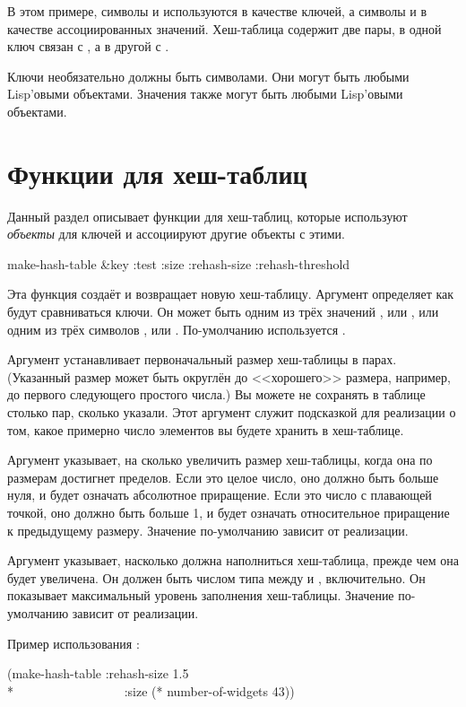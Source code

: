 В этом примере, символы  и  используются в качестве ключей, а
символы  и  в качестве ассоциированных значений. Хеш-таблица
содержит две пары, в одной ключ  связан с , а в другой
 с .

Ключи необязательно должны быть символами. Они могут быть любыми Lisp'овыми
объектами. Значения также могут быть любыми Lisp'овыми объектами.

\section{Функции для хеш-таблиц}

Данный раздел описывает функции для хеш-таблиц, которые используют
\emph{объекты} для ключей и ассоциируют другие объекты с этими.

\begin{defun}[Функция]
make-hash-table &key :test :size :rehash-size :rehash-threshold

Эта функция создаёт и возвращает новую хеш-таблицу.
Аргумент  определяет как будут сравниваться ключи.
Он может быть одним из трёх значений ,  или ,
или одним из трёх символов ,  или .
По-умолчанию используется .

Аргумент  устанавливает первоначальный размер хеш-таблицы в парах.
(Указанный размер может быть округлён до <<хорошего>> размера, например, до
первого следующего простого числа.)
Вы можете не сохранять в таблице столько пар, сколько указали. Этот аргумент
служит подсказкой для реализации о том, какое примерно число элементов вы будете
хранить в хеш-таблице.

Аргумент  указывает, на сколько увеличить размер хеш-таблицы,
когда она по размерам достигнет пределов.
Если это целое число, оно должно быть больше нуля, и будет означать абсолютное
приращение. Если это число с плавающей точкой, оно должно быть больше 1, и будет
означать относительное приращение к предыдущему размеру.
Значение по-умолчанию зависит от реализации.

\begin{newer}
Аргумент  указывает, насколько должна наполниться
хеш-таблица, прежде чем она будет увеличена. Он должен быть числом типа
 между  и , включительно.
Он показывает максимальный уровень заполнения хеш-таблицы.
Значение по-умолчанию зависит от реализации.
\end{newer}

Пример использования :
\begin{lisp}
(make-hash-table :rehash-size 1.5 \\*
~~~~~~~~~~~~~~~~~:size (* number-of-widgets 43))
\end{lisp}
\end{defun}

